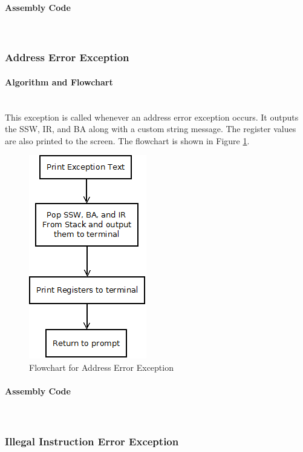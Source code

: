 \documentclass[12pt]{article}
\begin{document}
			\paragraph{Assembly Code}~\\				
			
			
			
		
			\subsubsection{Address Error Exception}
			\paragraph{Algorithm and Flowchart}~\\
			This exception is called whenever an address error exception occurs. It outputs the SSW, IR, and BA along with a custom string message. The register values are also printed to the screen. The flowchart is shown in Figure \ref{fig:AERR}.
			
				\begin{figure}[H]
					\centering
					\includegraphics[width=0.3\linewidth]{BERR}
					\caption{Flowchart for Address Error Exception}
					\label{fig:AERR}
				\end{figure}
			\paragraph{Assembly Code}~\\			
				
			
			\subsubsection{Illegal Instruction Error Exception}
\end{document}
